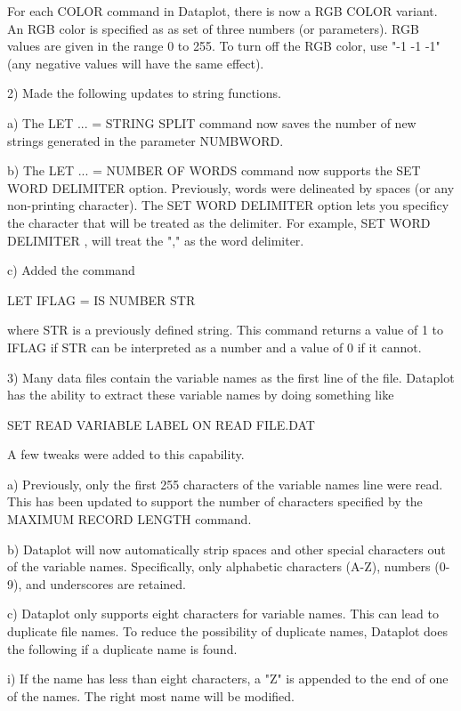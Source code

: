        For each COLOR command in Dataplot, there is now a
       RGB COLOR variant.  An RGB color is specified as as set
       of three numbers (or parameters).  RGB values are given
       in the range 0 to 255.  To turn off the RGB color, use
       "-1 -1 -1" (any negative values will have the same effect).

 2) Made the following updates to string functions.

    a) The LET ... = STRING SPLIT command now saves the number of new
       strings generated in the parameter NUMBWORD.

    b) The LET ... = NUMBER OF WORDS command now supports the 
       SET WORD DELIMITER option.  Previously, words were delineated by
       spaces (or any non-printing character).  The SET WORD DELIMITER
       option lets you specificy the character that will be treated as
       the delimiter.  For example, SET WORD DELIMITER , will treat
       the "," as the word delimiter.

     c) Added the command

           LET IFLAG = IS NUMBER STR

        where STR is a previously defined string.  This command
        returns a value of 1 to IFLAG if STR can be interpreted as a
        number and a value of 0 if it cannot.

 3) Many data files contain the variable names as the first line of the
    file.  Dataplot has the ability to extract these variable names by
    doing something like

        SET READ VARIABLE LABEL ON
        READ FILE.DAT

    A few tweaks were added to this capability.

    a) Previously, only the first 255 characters of the variable names
       line were read.  This has been updated to support the number
       of characters specified by the MAXIMUM RECORD LENGTH command.

    b) Dataplot will now automatically strip spaces and other special
       characters out of the variable names.  Specifically, only
       alphabetic characters (A-Z), numbers (0-9), and underscores are
       retained.

    c) Dataplot only supports eight characters for variable names.  This
       can lead to duplicate file names.  To reduce the possibility of
       duplicate names, Dataplot does the following if a duplicate name
       is found.

          i) If the name has less than eight characters, a "Z" is appended
             to the end of one of the names.  The right most name will
             be modified.

